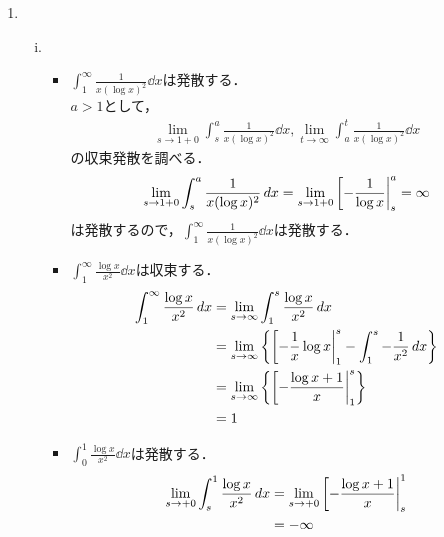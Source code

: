 



    
\maketitle

\begin{enumerate}[(1)]
    \item 
    \begin{enumerate}[(i)]
        \item \ 
        \begin{itemize}
            \item $\displaystyle \int_1^\infty \frac{1}{x(\log x)^2}\dd{x}$は発散する．\\
            $a>1$として，
            \begin{gather}
                \lim_{s\to 1+0}\int_s^a \frac{1}{x(\log x)^2}\dd{x}, \lim_{t\to \infty}\int_a^t \frac{1}{x(\log x)^2}\dd{x}
            \end{gather}
            の収束発散を調べる．
            \begin{equation}
                \lim_{s\to 1+0}\int_s^a \frac{1}{x(\log x)^2}\dd{x}=\lim_{s\to 1+0}\eval[-\frac{1}{\log x}|_s^a = \infty
            \end{equation}
            は発散するので，$\displaystyle \int_1^\infty \frac{1}{x(\log x)^2}\dd{x}$は発散する．
            \item $\displaystyle \int_1^\infty \frac{\log x}{x^2}\dd{x}$は収束する．
            \begin{align}
                \int_1^\infty \frac{\log x}{x^2}\dd{x}
                &=\lim_{s\to\infty}\int_1^s\frac{\log x}{x^2}\dd{x}\\
                &=\lim_{s\to\infty}\qty{\eval[-\frac{1}{x}\log x|_{1}^{s}-\int_1^s-\frac{1}{x^2}\dd{x}}\\
                &=\lim_{s\to\infty}\qty{\eval[-\frac{\log x+1}{x}|_{1}^{s}}\\
                &=1
            \end{align}
            \item $\displaystyle \int_0^1 \frac{\log x}{x^2}\dd{x}$は発散する．
            \begin{align}
                \lim_{s\to +0}\int_s^1\frac{\log x}{x^2}\dd{x}
                &=\lim_{s\to +0}\eval[-\frac{\log x+1}{x}|_s^1\\
                &=-\infty\\

\end{align}
\end{itemize}
\end{enumerate}
\end{enumerate}
